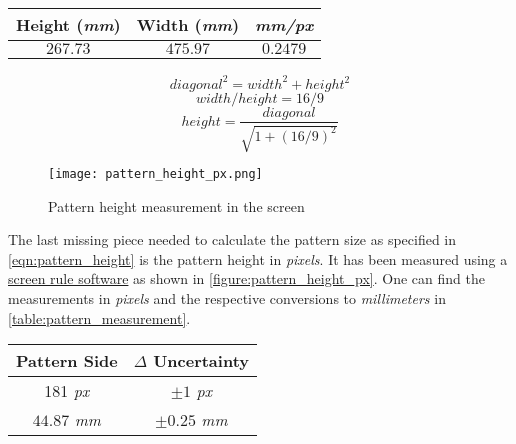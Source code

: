 \documentclass[
a4paper,
12pt,
]{article}
\begin{document}
\begin{minipage}{0.55\textwidth}
\centering
\begin{tabular}{c|c|c}
\hline
\textbf{Height (\emph{mm})}	
	& \textbf{Width (\emph{mm})}	
		& \textbf{\emph{mm/px}}\\
\hline
$267.73$
	& $475.97$
		& $0.2479$ \\
\hline
\end{tabular}
\label{table:screen_derived_parameters}
\end{minipage}
\begin{minipage}{0.4\textwidth}
\begin{equation}
\label{eqn:screen_diagonal}
diagonal^2 = width^2 + height^2
\end{equation}
\begin{equation}
\label{eqn:screen_aspect_ratio}
width/height = 16/9
\end{equation}
\begin{equation}
\label{eqn:screen_height}
height = \frac{diagonal}{\sqrt{1+(16/9)^2}}
\end{equation}
\end{minipage}
\medskip


\begin{wrapfigure}[11]{R}{7cm}
\centering
\caption{Pattern height measurement in the screen}
\label{figure:pattern_height_px}
\texttt{[image: pattern\_height\_px.png]}
\end{wrapfigure}

The last missing piece needed to calculate the pattern size as specified in \autoref{eqn:pattern_height} is the pattern height in \emph{pixels}. It has been measured using a \href{file:///C:/Users/esdan/OneDrive/Programs/jruler/JRuler.htm}{screen rule software} as shown in \autoref{figure:pattern_height_px}. One can find the measurements in \emph{pixels} and the respective conversions to \emph{millimeters} in \autoref{table:pattern_measurement}.
\medskip

\begin{minipage}{0.5\textwidth}
\centering
\begin{tabular}{c|c}
\hline
\textbf{Pattern Side}	
	& $\Delta$ \textbf{Uncertainty}	\\
\hline
181 \emph{px}
	& $\pm 1$ \emph{px}	\\
\hline
$44.87$ \emph{mm}
	& $\pm 0.25$ \emph{mm}	\\
\hline
\end{tabular}
\label{table:pattern_measurement}
\end{minipage}
\end{document}
